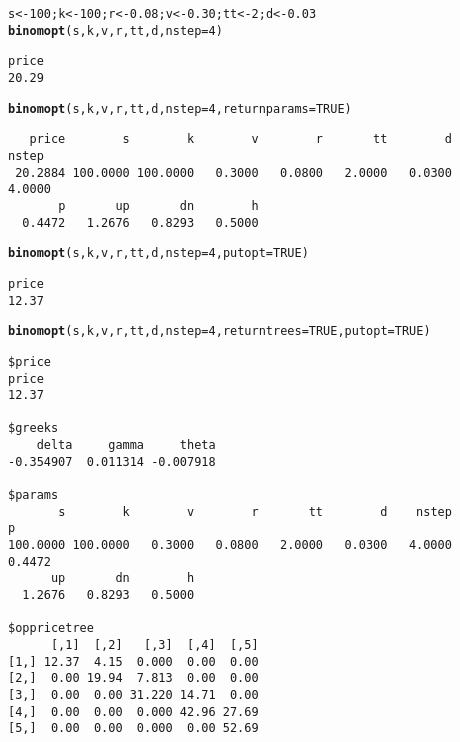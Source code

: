 \documentclass{article}\usepackage[]{graphicx}\usepackage[]{color}
\makeatletter
\newcommand{\hlnum}[1]{\textcolor[rgb]{0.686,0.059,0.569}{#1}}%
\newcommand{\hlstd}[1]{\textcolor[rgb]{0.345,0.345,0.345}{#1}}%
\newcommand{\hlkwb}[1]{\textcolor[rgb]{0.69,0.353,0.396}{#1}}%
\newcommand{\hlkwc}[1]{\textcolor[rgb]{0.333,0.667,0.333}{#1}}%
\newcommand{\hlkwd}[1]{\textcolor[rgb]{0.737,0.353,0.396}{\textbf{#1}}}%
\newenvironment{kframe}{%
 \def\at@end@of@kframe{}%
 \ifinner\ifhmode%
  \def\at@end@of@kframe{\end{minipage}}%
  \begin{minipage}{\columnwidth}%
 \fi\fi%
 \def\FrameCommand##1{\hskip\@totalleftmargin \hskip-\fboxsep
 \colorbox{shadecolor}{##1}\hskip-\fboxsep
     \hskip-\linewidth \hskip-\@totalleftmargin \hskip\columnwidth}%
 \MakeFramed {\advance\hsize-\width
   \@totalleftmargin\z@ \linewidth\hsize
   \@setminipage}}%
 {\par\unskip\endMakeFramed%
 \at@end@of@kframe}
\newenvironment{knitrout}{}{} %
\makeatother
\begin{document}
\begin{knitrout}\footnotesize
{}\color{fgcolor}\begin{kframe}
\begin{alltt}
\hlstd{s} \hlkwb{<-} \hlnum{100}\hlstd{; k} \hlkwb{<-} \hlnum{100}\hlstd{; r} \hlkwb{<-} \hlnum{0.08}\hlstd{; v} \hlkwb{<-} \hlnum{0.30}\hlstd{; tt} \hlkwb{<-} \hlnum{2}\hlstd{; d} \hlkwb{<-} \hlnum{0.03}
\hlkwd{binomopt}\hlstd{(s, k, v, r, tt, d,} \hlkwc{nstep}\hlstd{=}\hlnum{4}\hlstd{)}
\end{alltt}
\begin{verbatim}
price 
20.29 
\end{verbatim}
\begin{alltt}
\hlkwd{binomopt}\hlstd{(s, k, v, r, tt, d,} \hlkwc{nstep}\hlstd{=}\hlnum{4}\hlstd{,} \hlkwc{returnparams}\hlstd{=}\hlnum{TRUE}\hlstd{)}
\end{alltt}
\begin{verbatim}
   price        s        k        v        r       tt        d    nstep 
 20.2884 100.0000 100.0000   0.3000   0.0800   2.0000   0.0300   4.0000 
       p       up       dn        h 
  0.4472   1.2676   0.8293   0.5000 
\end{verbatim}
\begin{alltt}
\hlkwd{binomopt}\hlstd{(s, k, v, r, tt, d,} \hlkwc{nstep}\hlstd{=}\hlnum{4}\hlstd{,} \hlkwc{putopt}\hlstd{=}\hlnum{TRUE}\hlstd{)}
\end{alltt}
\begin{verbatim}
price 
12.37 
\end{verbatim}
\begin{alltt}
\hlkwd{binomopt}\hlstd{(s, k, v, r, tt, d,} \hlkwc{nstep}\hlstd{=}\hlnum{4}\hlstd{,} \hlkwc{returntrees}\hlstd{=}\hlnum{TRUE}\hlstd{,} \hlkwc{putopt}\hlstd{=}\hlnum{TRUE}\hlstd{)}
\end{alltt}
\begin{verbatim}
$price
price 
12.37 

$greeks
    delta     gamma     theta 
-0.354907  0.011314 -0.007918 

$params
       s        k        v        r       tt        d    nstep        p 
100.0000 100.0000   0.3000   0.0800   2.0000   0.0300   4.0000   0.4472 
      up       dn        h 
  1.2676   0.8293   0.5000 

$oppricetree
      [,1]  [,2]   [,3]  [,4]  [,5]
[1,] 12.37  4.15  0.000  0.00  0.00
[2,]  0.00 19.94  7.813  0.00  0.00
[3,]  0.00  0.00 31.220 14.71  0.00
[4,]  0.00  0.00  0.000 42.96 27.69
[5,]  0.00  0.00  0.000  0.00 52.69


\end{verbatim}
\end{kframe}
\end{knitrout}
\end{document}
